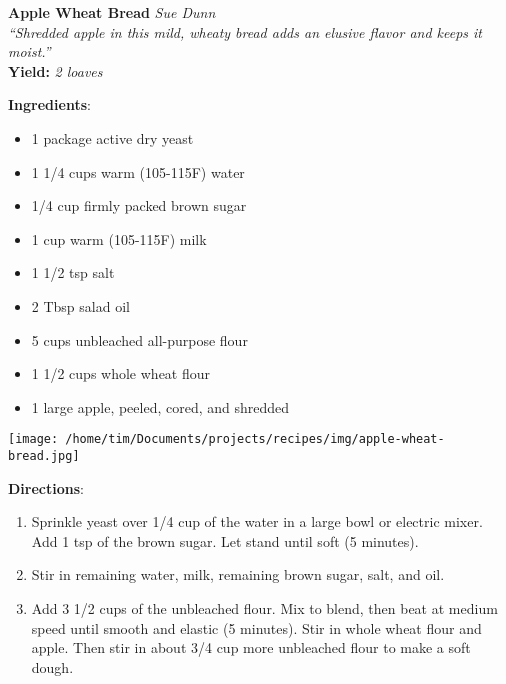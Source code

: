 \documentclass[11pt, twoside, openany]{book}
\begin{document}
\noindent\begin{minipage}[t]{\linewidth}%
{\Large\textbf{Apple Wheat Bread}} \label{apple-wheat-bread}\hfill\textit{Sue Dunn}\\
\textit{``Shredded apple in this mild, wheaty bread adds an elusive flavor and keeps it moist.''}\\
\textbf{Yield:} \textit{2 loaves}\\
\noindent\begin{minipage}[t]{0.78\linewidth}%
\textbf{Ingredients}:\vspace{-3mm}
\begin{multicols}{2}
\begin{itemize}\setlength\itemsep{-1mm}
\item 1 package active dry yeast
\item 1 1/4 cups warm (105-115F) water
\item 1/4 cup firmly packed brown sugar
\item 1 cup warm (105-115F) milk
\item 1 1/2 tsp salt
\item 2 Tbsp salad oil
\item 5 cups unbleached all-purpose flour
\item 1 1/2 cups whole wheat flour
\item 1 large apple, peeled, cored, and shredded
\end{itemize}
\end{multicols}
\end{minipage}
\noindent\begin{minipage}[t]{0.18\linewidth}
\centering \strut\vspace*{-\baselineskip}\newline
\texttt{[image: /home/tim/Documents/projects/recipes/img/apple-wheat-bread.jpg]}\\
\end{minipage}\vspace{3mm}
\textbf{Directions}:
\vspace{-3mm}\begin{enumerate}\setlength\itemsep{-1mm}
\item Sprinkle yeast over 1/4 cup of the water in a large bowl or electric mixer. Add 1 tsp of the brown sugar. Let stand until soft (5 minutes).
\item Stir in remaining water, milk, remaining brown sugar, salt, and oil.
\item Add 3 1/2 cups of the unbleached flour. Mix to blend, then beat at medium speed until smooth and elastic (5 minutes). Stir in whole wheat flour and apple. Then stir in about 3/4 cup more unbleached flour to make a soft dough.

\end{enumerate}
\end{minipage}
\end{document}
